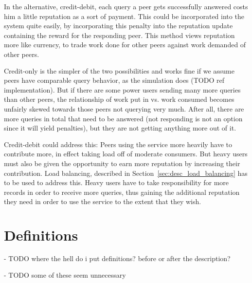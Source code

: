 In the alternative, credit-debit, each query a peer gets successfully answered
costs him a little reputation as a sort of payment. This could be incorporated
into the system quite easily, by incorporating this penalty into the reputation
update containing the reward for the responding peer. This method views
reputation more like currency, to trade work done for other peers against work
demanded of other peers.

Credit-only is the simpler of the two possibilities and works fine if we assume
peers have comparable query behavior, as the simulation does (TODO ref
implementation). But if there are some power users sending many more queries
than other peers, the relationship of work put in vs. work consumed becomes
unfairly skewed towards those peers not querying very much. After all, there are
more queries in total that need to be answered (not responding is not an option
since it will yield penalties), but they are not getting anything more out of
it.

Credit-debit could address this: Peers using the service more heavily have to
contribute more, in effect taking load off of moderate consumers. But heavy
users must also be given the opportunity to earn more reputation by increasing
their contribution. Load balancing, described in
Section~\ref{sec:desc_load_balancing} has to be used to address this. Heavy
users have to take responsibility for more records in order to receive more
queries, thus gaining the additional reputation they need in order to use the
service to the extent that they wish.

\section{Definitions}
- TODO where the hell do i put definitions? before or after the description?

- TODO some of these seem unnecessary

